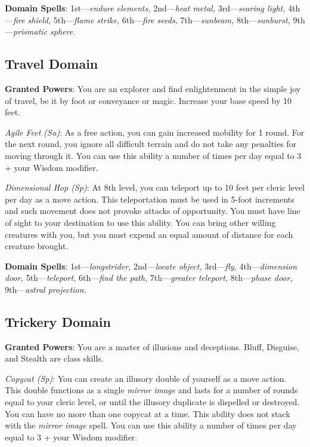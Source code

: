 \textbf{Domain Spells}: 1st---\textit{endure elements, }2nd---\textit{heat metal,} 3rd---\textit{searing light, }4th---\textit{fire shield, }5th---\textit{flame strike, }6th---\textit{fire seeds, }7th---\textit{sunbeam, }8th---\textit{sunburst, }9th---\textit{prismatic sphere.}
				
\subsection{Travel Domain}

				
\textbf{Granted Powers}: You are an explorer and find enlightenment in the simple joy of travel, be it by foot or 
conveyance or magic. Increase your base speed by 10 feet.
				
\textit{Agile Feet (Su)}: As a free action, you can gain increased mobility for 1 round. For the next round, you
ignore all difficult terrain and do not take any penalties for moving through it. You can use this ability a 
number of times per day equal to 3 + your Wisdom modifier.
				
\textit{Dimensional Hop (Sp)}: At 8th level, you can teleport up to 10 feet per cleric level per day as a move
action. This teleportation must be used in 5-foot increments and such movement does not provoke attacks of
opportunity. You must have line of sight to your destination to use this ability. You can bring other willing
creatures with you, but you must expend an equal amount of distance for each creature brought.
				
\textbf{Domain Spells}: 1st---\textit{longstrider, }2nd---\textit{locate object,} 3rd---\textit{fly, }4th---\textit{dimension door, }5th---\textit{teleport, }6th---\textit{find the path, }7th---\textit{greater teleport, }8th---\textit{phase door, }9th---\textit{astral projection.}
				
\subsection{Trickery Domain}

				
\textbf{Granted Powers}: You are a master of illusions and deceptions. Bluff, Disguise, and Stealth are class skills.
				
\textit{Copycat (Sp)}: You can create an illusory double of yourself as a move action. This double functions as a 
single \textit{mirror image} and lasts for a number of rounds equal to your cleric level, or until the illusory
duplicate is dispelled or destroyed. You can have no more than one copycat at a time. This ability does not stack
with the \textit{mirror image} spell. You can use this ability a number of times per day equal to 3 + your Wisdom
modifier.
				
